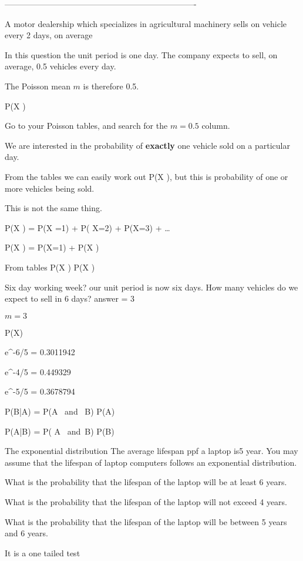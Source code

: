 ----------------------------------------------------------------------

A motor dealership which specializes in agricultural machinery sells on vehicle every 2 days, on average


In this question the unit period is one day. The company expects to sell, on average, 0.5 vehicles every day.

The Poisson mean $m$ is therefore 0.5.


P(X )


Go to your Poisson tables, and search for the $m=0.5$ column.

We are interested in the probability of \textbf{exactly} one vehicle sold on a particular day.

From the tables we can easily work out P(X ), but this is probability of one or more vehicles being sold.

This is not the same thing.

P(X ) = P(X =1) + P( X=2) + P(X=3) + \ldots

P(X ) = P(X=1) + P(X )

From tables
P(X )
P(X )


Six day working week?
our unit period is now six days.
How many vehicles do we expect to sell in 6 days?
answer = 3

$m=3$


P(X)


e^{-6/5} = 0.3011942

e^{-4/5} = 0.449329

e^{-5/5} = 0.3678794


P(B|A) = { P(A \mbox{ and } B) \over P(A) }
 
P(A|B) = { P( A \mbox{ and }B) \over P(B) }






The exponential distribution
The average lifespan ppf a laptop is5 year. You may assume that the lifespan of laptop computers follows an exponential distribution.

What is the probability that the lifespan of the laptop will be at least 6 years.

What is the probability that the lifespan of the laptop will not exceed 4 years.

What is the probability that the lifespan of the laptop will be between 5 years and 6 years.



It is a one tailed test

